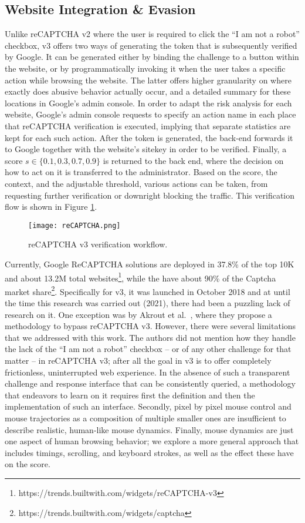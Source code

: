 \subsection{Website Integration \& Evasion}
Unlike reCAPTCHA v2 where the user is required to click the ``I am not a robot'' checkbox, v3 offers two ways of generating the token that is subsequently verified by Google.
It can be generated either by binding the challenge to a button within the website, or by programmatically invoking it when the user takes a specific action while browsing the website.
The latter offers higher granularity on where exactly does abusive behavior actually occur, and a detailed summary for these locations in Google's admin console.
In order to adapt the risk analysis for each website, Google's admin console requests to specify an action name in each place that reCAPTCHA verification is executed, implying that separate statistics are kept for each such action.
After the token is generated, the back-end forwards it to Google together with the website's sitekey in order to be verified.
Finally, a score $s \in \{0.1,0.3,0.7,0.9\}$ is returned to the back end, where the decision on how to act on it is transferred to the administrator.
Based on the score, the context, and the adjustable threshold, various actions can be taken, from requesting further verification or downright blocking the traffic.
This verification flow is shown in Figure \ref{flow}.

\begin{figure}[htbp]
\centerline{\texttt{[image: reCAPTCHA.png]}}
\caption{reCAPTCHA v3 verification workflow.}
\label{flow}
\end{figure}

Currently, Google ReCAPTCHA solutions are deployed in 37.8\% of the top 10K and about 13.2M total websites\footnote{https://trends.builtwith.com/widgets/reCAPTCHA-v3}, while the have about 90\% of the Captcha market share\footnote{https://trends.builtwith.com/widgets/captcha}.
Specifically for v3, it was launched in October 2018 and at until the time this research was carried out (2021), there had been a puzzling lack of research on it.
One exception was by Akrout et al.~\cite{akrout2019hacking}, where they propose a methodology to bypass reCAPTCHA v3.
However, there were several limitations that we addressed with this work.
The authors did not mention how they handle the lack of the ``I am not a robot'' checkbox -- or of any other challenge for that matter -- in reCAPTCHA v3; after all the goal in v3 is to offer completely frictionless, uninterrupted web experience.
In the absence of such a transparent challenge and response interface that can be consistently queried, a methodology that endeavors to learn on it requires first the definition and then the implementation of such an interface.
Secondly, pixel by pixel mouse control and mouse trajectories as a composition of multiple smaller ones are insufficient to describe realistic, human-like mouse dynamics.
Finally, mouse dynamics are just one aspect of human browsing behavior; we explore a more general approach that includes timings, scrolling, and keyboard strokes, as well as the effect these have on the score. 

